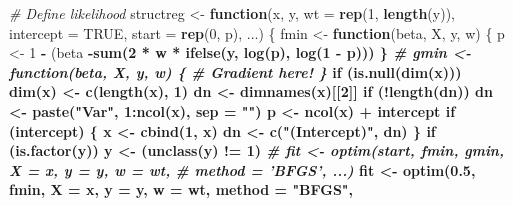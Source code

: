 \documentclass[]{article}
\newenvironment{Shaded}{\begin{snugshade}}{\end{snugshade}}
\newcommand{\KeywordTok}[1]{\textcolor[rgb]{0.13,0.29,0.53}{\textbf{#1}}}
\newcommand{\DataTypeTok}[1]{\textcolor[rgb]{0.13,0.29,0.53}{#1}}
\newcommand{\DecValTok}[1]{\textcolor[rgb]{0.00,0.00,0.81}{#1}}
\newcommand{\FloatTok}[1]{\textcolor[rgb]{0.00,0.00,0.81}{#1}}
\newcommand{\StringTok}[1]{\textcolor[rgb]{0.31,0.60,0.02}{#1}}
\newcommand{\CommentTok}[1]{\textcolor[rgb]{0.56,0.35,0.01}{\textit{#1}}}
\newcommand{\OtherTok}[1]{\textcolor[rgb]{0.56,0.35,0.01}{#1}}
\newcommand{\ControlFlowTok}[1]{\textcolor[rgb]{0.13,0.29,0.53}{\textbf{#1}}}
\newcommand{\OperatorTok}[1]{\textcolor[rgb]{0.81,0.36,0.00}{\textbf{#1}}}
\newcommand{\NormalTok}[1]{#1}
\let\oldShaded\Shaded
\let\endoldShaded\endShaded
\renewenvironment{Shaded}{\footnotesize\oldShaded}{\endoldShaded}
\begin{document}
\begin{Shaded}
\begin{Highlighting}[]
\CommentTok{# Define likelihood}
\NormalTok{structreg <-}\StringTok{ }\ControlFlowTok{function}\NormalTok{(x, y, }\DataTypeTok{wt =} \KeywordTok{rep}\NormalTok{(}\DecValTok{1}\NormalTok{, }\KeywordTok{length}\NormalTok{(y)), }\DataTypeTok{intercept =} \OtherTok{TRUE}\NormalTok{, }
    \DataTypeTok{start =} \KeywordTok{rep}\NormalTok{(}\DecValTok{0}\NormalTok{, p), ...) \{}
\NormalTok{    fmin <-}\StringTok{ }\ControlFlowTok{function}\NormalTok{(beta, X, y, w) \{}
\NormalTok{        p <-}\StringTok{ }\DecValTok{1} \OperatorTok{-}\StringTok{ }\NormalTok{(beta }\OperatorTok{%
        \OperatorTok{-}\KeywordTok{sum}\NormalTok{(}\DecValTok{2} \OperatorTok{*}\StringTok{ }\NormalTok{w }\OperatorTok{*}\StringTok{ }\KeywordTok{ifelse}\NormalTok{(y, }\KeywordTok{log}\NormalTok{(p), }\KeywordTok{log}\NormalTok{(}\DecValTok{1} \OperatorTok{-}\StringTok{ }\NormalTok{p)))}
\NormalTok{    \}}
    \CommentTok{# gmin <- function(beta, X, y, w) \{ # Gradient here!  \}}
    \ControlFlowTok{if}\NormalTok{ (}\KeywordTok{is.null}\NormalTok{(}\KeywordTok{dim}\NormalTok{(x))) }
        \KeywordTok{dim}\NormalTok{(x) <-}\StringTok{ }\KeywordTok{c}\NormalTok{(}\KeywordTok{length}\NormalTok{(x), }\DecValTok{1}\NormalTok{)}
\NormalTok{    dn <-}\StringTok{ }\KeywordTok{dimnames}\NormalTok{(x)[[}\DecValTok{2}\NormalTok{]]}
    \ControlFlowTok{if}\NormalTok{ (}\OperatorTok{!}\KeywordTok{length}\NormalTok{(dn)) }
\NormalTok{        dn <-}\StringTok{ }\KeywordTok{paste}\NormalTok{(}\StringTok{"Var"}\NormalTok{, }\DecValTok{1}\OperatorTok{:}\KeywordTok{ncol}\NormalTok{(x), }\DataTypeTok{sep =} \StringTok{""}\NormalTok{)}
\NormalTok{    p <-}\StringTok{ }\KeywordTok{ncol}\NormalTok{(x) }\OperatorTok{+}\StringTok{ }\NormalTok{intercept}
    \ControlFlowTok{if}\NormalTok{ (intercept) \{}
\NormalTok{        x <-}\StringTok{ }\KeywordTok{cbind}\NormalTok{(}\DecValTok{1}\NormalTok{, x)}
\NormalTok{        dn <-}\StringTok{ }\KeywordTok{c}\NormalTok{(}\StringTok{"(Intercept)"}\NormalTok{, dn)}
\NormalTok{    \}}
    \ControlFlowTok{if}\NormalTok{ (}\KeywordTok{is.factor}\NormalTok{(y)) }
\NormalTok{        y <-}\StringTok{ }\NormalTok{(}\KeywordTok{unclass}\NormalTok{(y) }\OperatorTok{!=}\StringTok{ }\DecValTok{1}\NormalTok{)}
    \CommentTok{# fit <- optim(start, fmin, gmin, X = x, y = y, w = wt,}
    \CommentTok{# method = 'BFGS', ...)}
\NormalTok{    fit <-}\StringTok{ }\KeywordTok{optim}\NormalTok{(}\FloatTok{0.5}\NormalTok{, fmin, }\DataTypeTok{X =}\NormalTok{ x, }\DataTypeTok{y =}\NormalTok{ y, }\DataTypeTok{w =}\NormalTok{ wt, }\DataTypeTok{method =} \StringTok{"BFGS"}\NormalTok{, }
}
\end{Highlighting}
\end{Shaded}
\end{document}
